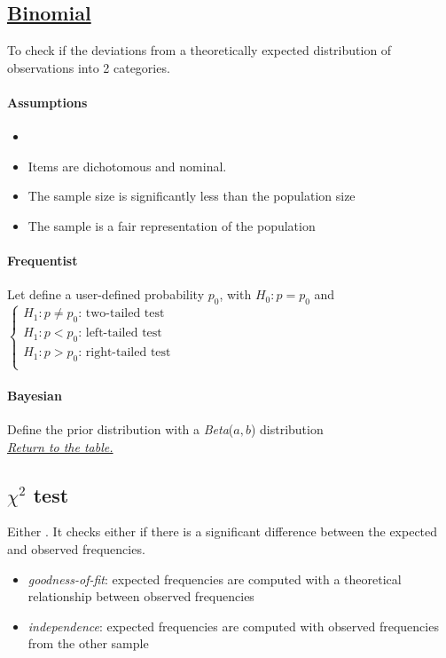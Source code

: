 \subsection{\hyperref[binomial_test]{Binomial}}
To check if the deviations from a theoretically expected distribution of observations into
2 categories.\\

\paragraph{Assumptions}
\begin{itemize}
    \item {}
    \item Items are dichotomous and nominal.
    \item The sample size is significantly less than the population size
    \item The sample is a fair representation of the population
\end{itemize}


\paragraph{Frequentist}
Let define a user-defined probability $p_{0}$, with $H_{0}: p = p_{0}$ and
$\begin{cases}
    H_{1}: p \neq p_{0}\text{: two-tailed test} \\
    H_{1}: p < p_{0}\text{: left-tailed test} \\
    H_{1}: p > p_{0}\text{: right-tailed test} \\
     
\end{cases}$

\paragraph{Bayesian}
Define the prior distribution with a \emph{Beta}($a,b$) distribution\\

\textit{\hyperref[statistical_method_table]{Return to the table.}}


\subsection{$\chi^{2}$ test}
Either .
It checks either if there is a significant difference between the expected and observed 
frequencies.
\begin{itemize}
    \item \emph{goodness-of-fit}: expected frequencies are computed with a theoretical 
        relationship between observed frequencies
    \item \emph{independence}: expected frequencies are computed with observed frequencies
        from the other sample
\end{itemize}
